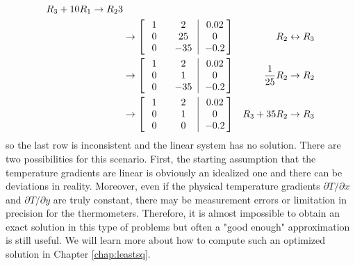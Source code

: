 \begin{solution}
\begin{align*}
\begin{aligned}
R_3 + 10R_1 \to R_23\\
\end{aligned} \\
&\to 
\left[\begin{array}{@{}wc{20pt}wc{20pt}|wc{24pt}@{}}   
1 & 2 & 0.02 \\
0 & 25 & 0 \\
0 & -35 & -0.2 
\end{array}\right]
& R_2 \leftrightarrow R_3 \\
&\to 
\left[\begin{array}{@{}wc{20pt}wc{20pt}|wc{24pt}@{}}   
1 & 2 & 0.02 \\
0 & 1 & 0 \\
0 & -35 & -0.2 
\end{array}\right]
& \frac{1}{25}R_2 \to R_2 \\
&\to 
\left[\begin{array}{@{}wc{20pt}wc{20pt}|wc{24pt}@{}}   
1 & 2 & 0.02 \\
0 & 1 & 0 \\
0 & 0 & -0.2 
\end{array}\right]
& R_3 + 35R_2 \to R_3 
\end{align*}
so the last row is inconsistent and the linear system has no solution. There are two possibilities for this scenario. First, the starting assumption that the temperature gradients are linear is obviously an idealized one and there can be deviations in reality. Moreover, even if the physical temperature gradients $\partial T/\partial x$ and $\partial T/\partial y$ are truly constant, there may be measurement errors or limitation in precision for the thermometers. Therefore, it is almost impossible to obtain an exact solution in this type of problems but often a "good enough" approximation is still useful. We will learn more about how to compute such an optimized solution in Chapter \ref{chap:leastsq}.
\end{solution}


